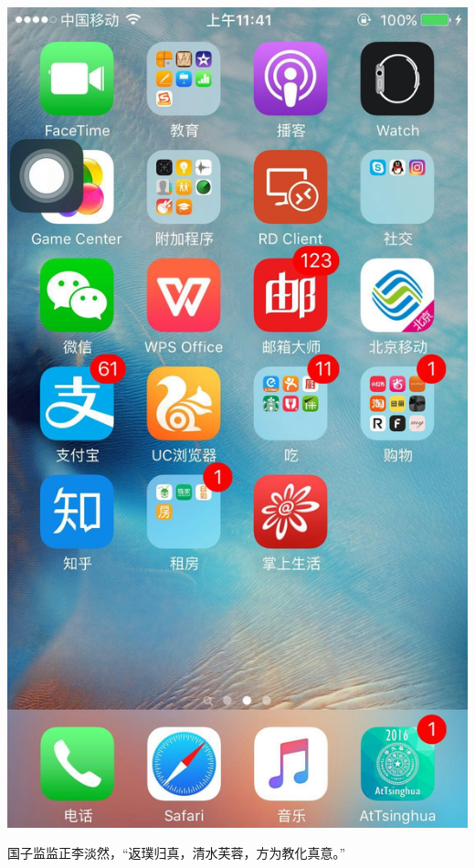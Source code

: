 \documentclass[12pt, a4paper]{book}
\begin{document}
\begin{CJK}{UTF8}{gbsn}
    \begin{center}
    \includegraphics[height=0.3\textheight]{./figure/desktop-5.jpg}
    \end{center}

    国子监监正李淡然，“返璞归真，清水芙蓉，方为教化真意。”


\end{CJK}
\end{document}
